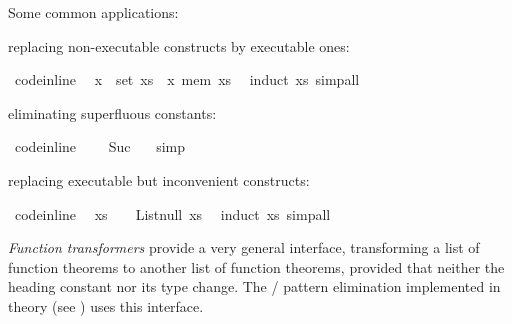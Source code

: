 \begin{isabellebody}
\begin{isamarkuptext}
  Some common applications:%
\end{isamarkuptext}%
\isamarkuptrue%
%
\begin{itemize}
%
\begin{isamarkuptext}%
\item replacing non-executable constructs by executable ones:%
\end{isamarkuptext}%
\isamarkuptrue%
%
\isadelimquote
%
\endisadelimquote
%
\isatagquote
{}\isamarkupfalse%
\ {\isacharbrackleft}code{\isacharunderscore}inline{\isacharbrackright}{\isacharcolon}\isanewline
\ \ {\isachardoublequoteopen}x\ {\isasymin}\ set\ xs\ {\isasymlongleftrightarrow}\ x\ mem\ xs{\isachardoublequoteclose}\ \isamarkupfalse%
\ {\isacharparenleft}induct\ xs{\isacharparenright}\ simp{\isacharunderscore}all%
\endisatagquote
{\isafoldquote}%
%
\isadelimquote
%
\endisadelimquote
%
\begin{isamarkuptext}%
\item eliminating superfluous constants:%
\end{isamarkuptext}%
\isamarkuptrue%
%
\isadelimquote
%
\endisadelimquote
%
\isatagquote
{}\isamarkupfalse%
\ {\isacharbrackleft}code{\isacharunderscore}inline{\isacharbrackright}{\isacharcolon}\isanewline
\ \ {\isachardoublequoteopen}{}\ {\isacharequal}\ Suc\ {}{\isachardoublequoteclose}\ \isamarkupfalse%
\ simp%
\endisatagquote
{\isafoldquote}%
%
\isadelimquote
%
\endisadelimquote
%
\begin{isamarkuptext}%
\item replacing executable but inconvenient constructs:%
\end{isamarkuptext}%
\isamarkuptrue%
%
\isadelimquote
%
\endisadelimquote
%
\isatagquote
{}\isamarkupfalse%
\ {\isacharbrackleft}code{\isacharunderscore}inline{\isacharbrackright}{\isacharcolon}\isanewline
\ \ {\isachardoublequoteopen}xs\ {\isacharequal}\ {\isacharbrackleft}{\isacharbrackright}\ {\isasymlongleftrightarrow}\ List{\isachardot}null\ xs{\isachardoublequoteclose}\ \isamarkupfalse%
\ {\isacharparenleft}induct\ xs{\isacharparenright}\ simp{\isacharunderscore}all%
\endisatagquote
{\isafoldquote}%
%
\isadelimquote
%
\endisadelimquote
%
\end{itemize}
%
\begin{isamarkuptext}%
\noindent \emph{Function transformers} provide a very general interface,
  transforming a list of function theorems to another
  list of function theorems, provided that neither the heading
  constant nor its type change.  The  / 
  pattern elimination implemented in
  theory  (see ) uses this
  interface.


\end{isamarkuptext}
\end{isabellebody}
